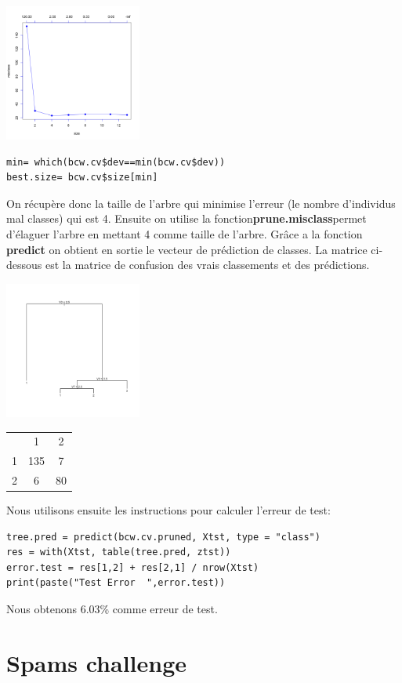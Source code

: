 \documentclass[10pt]{article}
\begin{document}
\begin{minipage}{.4\textwidth}
	\includegraphics[width=45mm]{Figures/bcw_cvplot.png}
\end{minipage}%
\hspace{0.01\linewidth}
\begin{minipage}{.65\textwidth}
 \begin{lstlisting}
min= which(bcw.cv$dev==min(bcw.cv$dev))
best.size= bcw.cv$size[min]
 \end{lstlisting}
\end{minipage}
On récupère donc la taille de l'arbre qui minimise l'erreur (le nombre d'individus mal classes) qui est 4. Ensuite on utilise la fonction\textbf{prune.misclass}permet d’élaguer l’arbre en mettant 4 comme taille de l'arbre. Grâce a la fonction \textbf{predict} on obtient en sortie le vecteur de prédiction de classes. La matrice ci-dessous est la matrice de confusion des vrais classements et des prédictions.
\begin{minipage}{.5\textwidth}
	\includegraphics[width=45mm]{Figures/bcw_prunedtree.png}
\end{minipage}%
\hspace{0.00\linewidth}
\begin{minipage}{.4\textwidth}
\begin{tabular}{c  c c}
  & 1  &  2 \\
1 & 135 &   7 \\
2 &  6&  80
\end{tabular}
\end{minipage}

Nous utilisons ensuite les instructions pour calculer l'erreur de test:
\begin{lstlisting}
tree.pred = predict(bcw.cv.pruned, Xtst, type = "class")
res = with(Xtst, table(tree.pred, ztst))
error.test = res[1,2] + res[2,1] / nrow(Xtst)
print(paste("Test Error  ",error.test))
\end{lstlisting}

Nous obtenons 6.03\% comme erreur de test.

\section{Spams challenge}
\end{document}
